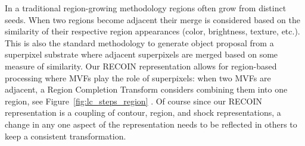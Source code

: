



In a traditional region-growing methodology regions often grow from distinct seeds. When two regions become adjacent their merge is considered based on the similarity of their respective region appearances (color, brightness, texture, etc.). This is also the standard methodology to generate object proposal from a superpixel substrate where adjacent superpixels are merged based on some measure of similarity. Our RECOIN representation allows for region-based processing where MVFs play the role of superpixels: when two MVFs are adjacent, a Region Completion Transform considers combining them into one region, see Figure~\ref{fig:lc_steps_region} . Of course since our RECOIN representation is a coupling of contour, region, and shock representations, a change in any one aspect of the representation needs to be reflected in others to keep a consistent transformation.

